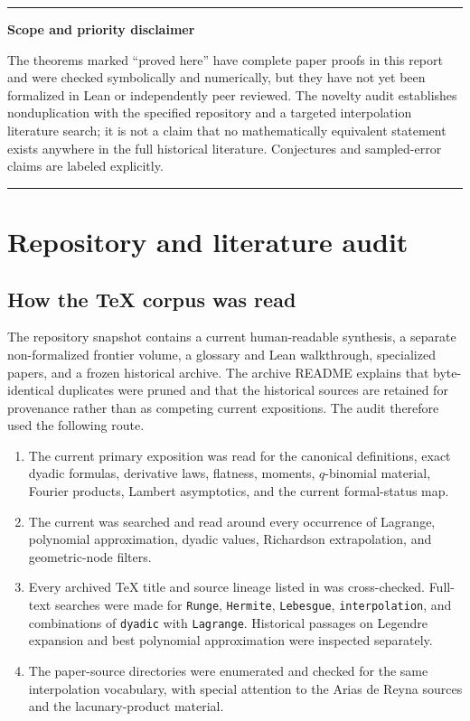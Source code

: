 \documentclass[11pt,oneside]{article}
\theoremstyle{definition}
\theoremstyle{remark}
\newenvironment{statusbox}[1]{%
  \par\smallskip\noindent\begin{center}\begin{minipage}{0.94\textwidth}%
  \hrule\vspace{0.5em}\noindent\textbf{#1}\par\smallskip
}{%
  \vspace{0.5em}\hrule\end{minipage}\end{center}\smallskip
}
\begin{document}
\begin{statusbox}{Scope and priority disclaimer}
The theorems marked ``proved here'' have complete paper proofs in this report and were
checked symbolically and numerically, but they have not yet been formalized in Lean or
independently peer reviewed.  The novelty audit establishes nonduplication with the
specified repository and a targeted interpolation literature search; it is not a claim that
no mathematically equivalent statement exists anywhere in the full historical literature.
Conjectures and sampled-error claims are labeled explicitly.
\end{statusbox}

\section{Repository and literature audit}
\label{sec:audit}

\subsection{How the TeX corpus was read}

The repository snapshot contains a current human-readable synthesis, a separate
non-formalized frontier volume, a glossary and Lean walkthrough, specialized papers, and a
frozen historical archive.  The archive README explains that byte-identical duplicates were
pruned and that the historical sources are retained for provenance rather than as competing
current expositions.  The audit therefore used the following route.

\begin{enumerate}
\item The current primary exposition
 was read for the
canonical definitions, exact dyadic formulas, derivative laws, flatness, moments,
$q$-binomial material, Fourier products, Lambert asymptotics, and the current formal-status
map.
\item The current
 was searched
and read around every occurrence of Lagrange, polynomial approximation, dyadic values,
Richardson extrapolation, and geometric-node filters.
\item Every archived TeX title and source lineage listed in  was
cross-checked.  Full-text searches were made for \texttt{Runge}, \texttt{Hermite},
\texttt{Lebesgue}, \texttt{interpolation}, and combinations of \texttt{dyadic} with
\texttt{Lagrange}.  Historical passages on Legendre expansion and best polynomial
approximation were inspected separately.
\item The paper-source directories were enumerated and checked for the same interpolation
vocabulary, with special attention to the Arias de Reyna sources and the lacunary-product
material.
\end{enumerate}
\end{document}
